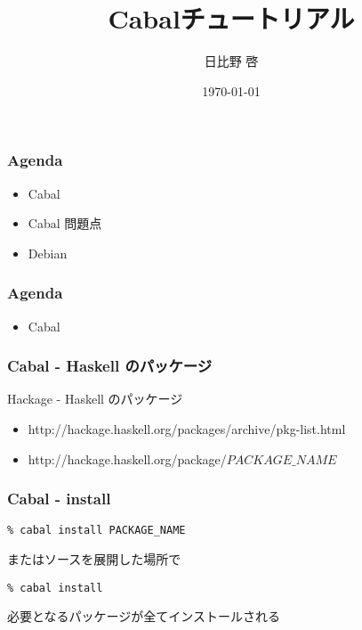 \documentclass[cjk,dvipdfm,12pt]{beamer}
\title{Cabalチュートリアル}
\author{日比野 啓}
\date{ \today }
\begin{document}
\begin{frame}

\frametitle{Agenda}
\begin{itemize}
\item Cabal
\item Cabal 問題点
\item Debian
\end{itemize}

\end{frame}

\begin{frame}

\frametitle{Agenda}

\begin{itemize}
\item Cabal
\end{itemize}

\end{frame}

\begin{frame}
\frametitle{Cabal - Haskell のパッケージ}

Hackage - Haskell のパッケージ

\begin{itemize}
\item http://hackage.haskell.org/packages/archive/pkg-list.html
\item http://hackage.haskell.org/package/$PACKAGE\_NAME$
\end{itemize}

\end{frame}

\begin{frame}[fragile]
\frametitle{Cabal - install}

\lstset{language=bash,basicstyle=\ttfamily}

\begin{lstlisting}
% cabal install PACKAGE_NAME
\end{lstlisting}

またはソースを展開した場所で

\begin{lstlisting}
% cabal install
\end{lstlisting}

必要となるパッケージが全てインストールされる

\end{frame}

\end{document}
